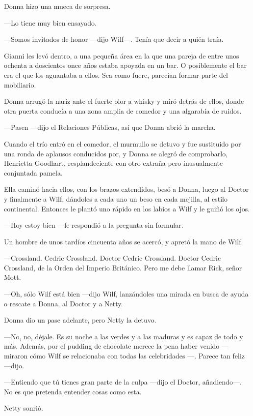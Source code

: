 Donna hizo una mueca de sorpresa.

---Lo tiene muy bien ensayado.

---Somos invitados de honor ---dijo Wilf---. Tenía que decir a quién
traía.

Gianni les levó dentro, a una pequeña área en la que una pareja de entre
unos ochenta a doscientos once años estaba apoyada en un bar. O
posiblemente el bar era el que los aguantaba a ellos. Sea como fuere,
parecían formar parte del mobiliario.

Donna arrugó la nariz ante el fuerte olor a whisky y miró detrás de
ellos, donde otra puerta conducía a una zona amplia de comedor y una
algarabía de ruidos.

---Pasen ---dijo el Relaciones Públicas, así que Donna abrió la marcha.

Cuando el trío entró en el comedor, el murmullo se detuvo y fue
sustituido por una ronda de aplausos conducidos por, y Donna se alegró
de comprobarlo, Henrietta Goodhart, resplandeciente con otro extraña
pero inusualmente conjuntada pamela.

Ella caminó hacia ellos, con los brazos extendidos, besó a Donna, luego
al Doctor y finalmente a Wilf, dándoles a cada uno un beso en cada
mejilla, al estilo continental. Entonces le plantó uno rápido en los
labios a Wilf y le guiñó los ojos.

---Hoy estoy bien ---le respondió a la pregunta sin formular.

Un hombre de unos tardíos cincuenta años se acercó, y apretó la mano de
Wilf.

---Crossland. Cedric Crossland. Doctor Cedric Crossland. Doctor Cedric
Crossland, de la Orden del Imperio Británico. Pero me debe llamar Rick,
señor Mott.

---Oh, sólo Wilf está bien ---dijo Wilf, lanzándoles una mirada en busca
de ayuda o rescate a Donna, al Doctor y a Netty.

Donna dio un pase adelante, pero Netty la detuvo.

---No, no, déjale. Es su noche a las verdes y a las maduras y es capaz
de todo y más. Además, por el pudding de chocolate merece la pena haber
venido ---miraron cómo Wilf se relacionaba con todas las celebridades
---. Parece tan feliz ---dijo.

---Entiendo que tú tienes gran parte de la culpa ---dijo el Doctor,
añadiendo---. No es que pretenda entender cosas como esta.

Netty sonrió.


